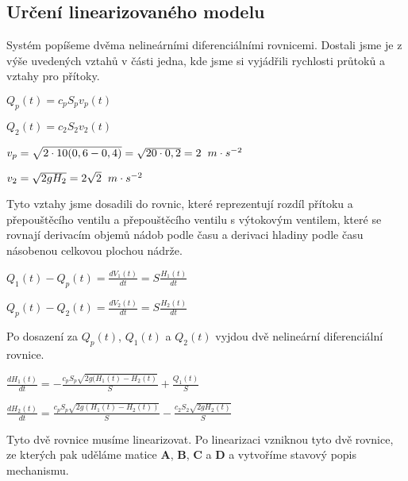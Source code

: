 \documentclass{article}
\begin{document}
		\subsection{Určení linearizovaného modelu}
			Systém popíšeme dvěma nelineárními diferenciálními rovnicemi. Dostali jsme je z výše uvedených vztahů v části jedna, kde jsme si vyjádřili rychlosti průtoků a vztahy pro přítoky. 
			
			\begin{center} 
			$Q_p (t)=c_pS_pv_p(t)$  
			
			\bigskip
			
			$Q_2(t)=c_2S_2v_2(t)$
			
			\bigskip
			
			$v_p=\sqrt{2 \cdot 10(0,6-0,4)}=\sqrt{20\cdot0,2}=2 \hspace{2mm} m \cdot s^{-2}$ 
			
			\bigskip
			
			$v_2=\sqrt{2gH_2}=2\sqrt{2} \hspace{2mm} m \cdot s^{-2}$
			\end{center} 
			
			Tyto vztahy jsme dosadili do rovnic, které reprezentují rozdíl přítoku a přepouštěcího ventilu a přepouštěcího ventilu s výtokovým ventilem, které se rovnají derivacím objemů nádob podle času a derivaci hladiny podle času násobenou celkovou plochou nádrže.
			\begin{center} 
			$Q_1(t)-Q_p (t)=\frac{dV_1(t)}{dt}=S\frac{H_1(t)}{dt}$  
			
			\bigskip
			
			$Q_p(t)-Q_2(t)=\frac{dV_2(t)}{dt}=S\frac{H_2(t)}{dt}$  
			\end{center}
			
			Po dosazení za $Q_p(t)$, $Q_1(t)$ a $Q_2(t)$ vyjdou dvě nelineární diferenciální rovnice.
			\begin{center}
			$\frac{dH_1(t)}{dt}=-\frac{c_pS_p\sqrt{2g(H_1(t)-H_2(t)}}{S}+\frac{Q_1(t)}{S}$
			
			\bigskip
			
			$\frac{dH_2(t)}{dt}=\frac{c_pS_p\sqrt{2g(H_1(t)-H_2(t))}}{S}-\frac{c_2S_2\sqrt{2gH_2(t)}}{S}$
			\end{center}
			
			Tyto dvě rovnice musíme linearizovat. Po linearizaci vzniknou tyto dvě rovnice, ze kterých pak uděláme matice \textbf{A}, \textbf{B}, \textbf{C} a \textbf{D} a vytvoříme stavový popis mechanismu. 
			
\end{document}
